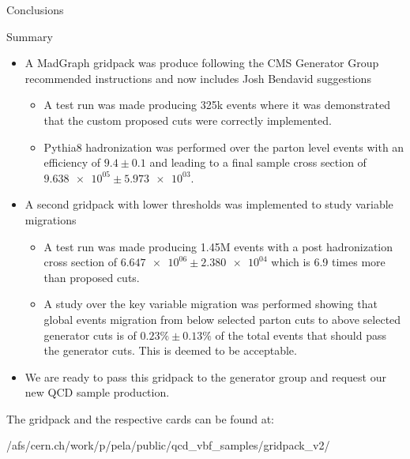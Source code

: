 \documentclass[8pt]{beamer}
\begin{document}
\begin{frame}{Conclusions}

\begin{block}{Summary}
  
\begin{itemize}
  \item A MadGraph gridpack was produce following the CMS Generator Group recommended instructions and now includes Josh Bendavid suggestions
  \begin{itemize}
    \item A test run was made producing 325k events where it was demonstrated that the custom proposed cuts were correctly implemented.
    \item Pythia8 hadronization was performed over the parton level events with an efficiency of $ 9.4 \pm 0.1$ and leading to a final sample cross section of $\num{9.638e+05} \pm \num{5.973e+03}$.
  \end{itemize}
  \item A second gridpack with lower thresholds was implemented to study variable migrations
  \begin{itemize}
    \item A test run was made producing 1.45M events with a post hadronization cross section of $\num{6.647e+06} \pm \num{2.380e+04}$ which is 6.9 times more than proposed cuts.
    \item A study over the key variable migration was performed showing that global events migration from below selected parton cuts to above selected generator cuts is of $0.23\% \pm 0.13\%$ of the total events that should pass the generator cuts. This is deemed to be acceptable.
  \end{itemize}
  \item We are ready to pass this gridpack to the generator group and request our new QCD sample production.
\end{itemize}

The gridpack and the respective cards can be found at:
\begin{center}
/afs/cern.ch/work/p/pela/public/qcd\_vbf\_samples/gridpack\_v2/
\end{center}

\end{block}

\end{frame}
\end{document}

